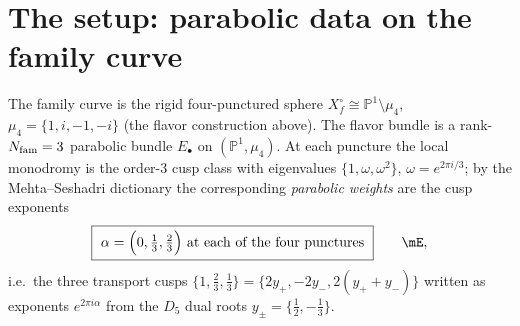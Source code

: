\section{The setup: parabolic data on the family curve}
The family curve is the rigid four-punctured sphere $X_f^\circ\cong\mathbb P^1\setminus\mu_4$,
$\mu_4=\{1,i,-1,-i\}$ (the flavor construction above). The flavor bundle is a rank-$N_{\mathrm{fam}}=3$ parabolic bundle $E_\bullet$ on
$(\mathbb P^1,\mu_4)$. At each puncture the local monodromy is the order-$3$ cusp class with eigenvalues
$\{1,\omega,\omega^2\}$, $\omega=e^{2\pi i/3}$; by the Mehta--Seshadri dictionary the corresponding
\emph{parabolic weights} are the cusp exponents
\begin{equation}
  \boxed{\ \alpha=\Bigl(0,\tfrac13,\tfrac23\Bigr)\ \text{at each of the four punctures}\ }\qquad\mE ,
\end{equation}
i.e.\ the three transport cusps $\{1,\tfrac23,\tfrac13\}=\{2y_+,-2y_-,2(y_++y_-)\}$ written as
exponents $e^{2\pi i\alpha}$ from the $D_5$ dual roots $y_\pm=\{\tfrac12,-\tfrac13\}$.

